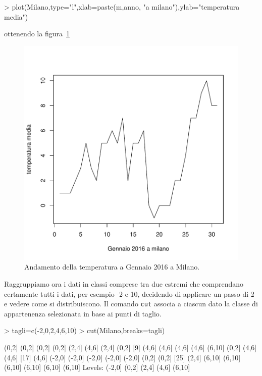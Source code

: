\documentclass[onecolumn,12pt]{book}
\begin{document}
\begin{Schunk}
\begin{Sinput}
> plot(Milano,type="l",xlab=paste(m,anno, "a milano"),ylab="temperatura media")
\end{Sinput}
\end{Schunk}
ottenendo la figura~\ref{fig:datiist}
\begin{figure}[htbp]
\begin{center}
\includegraphics{RbookParte2-111}
\caption{ Andamento della temperatura a Gennaio 2016  a Milano. }
\label{fig:datiist}
\end{center}
\end{figure}

Raggruppiamo ora i dati in classi comprese  tra due estremi che comprendano certamente tutti i dati, per esempio -2 e 10, decidendo di applicare un passo di 2 e vedere come si distribuiscono. Il comando \texttt{cut} associa a ciascun dato la classe di appartenenza selezionata in base ai punti di taglio.

\begin{Schunk}
\begin{Sinput}
> tagli=c(-2,0,2,4,6,10)
> cut(Milano,breaks=tagli)
\end{Sinput}
\begin{Soutput}
 [1] (0,2]  (0,2]  (0,2]  (0,2]  (2,4]  (4,6]  (2,4]  (0,2] 
 [9] (4,6]  (4,6]  (4,6]  (4,6]  (6,10] (0,2]  (4,6]  (4,6] 
[17] (4,6]  (-2,0] (-2,0] (-2,0] (-2,0] (-2,0] (0,2]  (0,2] 
[25] (2,4]  (6,10] (6,10] (6,10] (6,10] (6,10] (6,10]
Levels: (-2,0] (0,2] (2,4] (4,6] (6,10]
\end{Soutput}
\end{Schunk}
\end{document}
